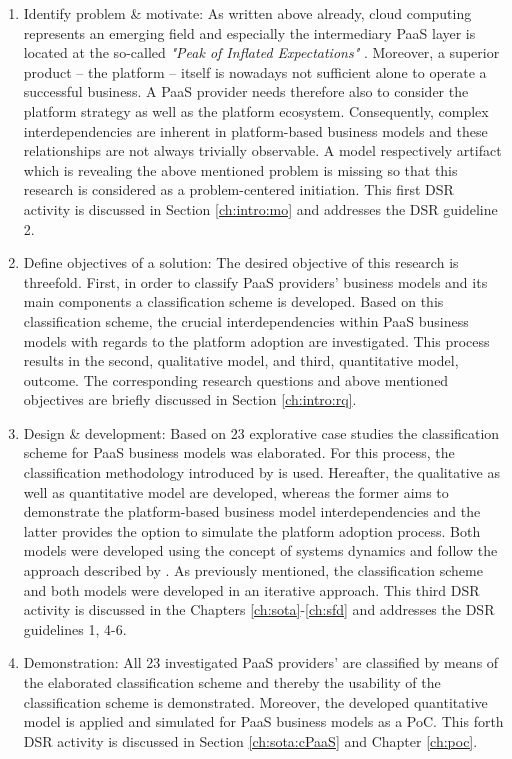 \begin{enumerate}
	\item Identify problem \& motivate: As written above already, cloud computing represents an emerging field and especially the intermediary \ac{PaaS} layer is located at the so-called \textit{"Peak of Inflated Expectations"} \citep[p. 5]{Smith2012}. Moreover, a superior product -- the platform -- itself is nowadays not sufficient alone to operate a successful business. A \ac{PaaS} provider needs therefore also to consider the platform strategy as well as the platform ecosystem. Consequently, complex interdependencies are inherent in platform-based business models and these relationships are not always trivially observable. A model respectively artifact which is revealing the above mentioned problem is missing so that this research is considered as a problem-centered initiation. This first \ac{DSR} activity is discussed in Section \ref{ch:intro:mo} and addresses the \ac{DSR} guideline 2.
	\item Define objectives of a solution: The desired objective of this research is threefold. First, in order to classify \ac{PaaS} providers' business models and its main components a classification scheme is developed. Based on this classification scheme, the crucial interdependencies within \ac{PaaS} business models with regards to the platform adoption are investigated. This process results in the second, qualitative model, and third, quantitative model, outcome. The corresponding research questions and above mentioned objectives are briefly discussed in Section \ref{ch:intro:rq}.
	\item Design \& development: Based on 23 explorative case studies the classification scheme for \ac{PaaS} business models was elaborated. For this process, the classification methodology introduced by \citet{Fettke2003} is used. Hereafter, the qualitative as well as quantitative model are developed, whereas the former aims to demonstrate the platform-based business model interdependencies and the latter provides the option to simulate the platform adoption process. Both models were developed using the concept of systems dynamics and follow the approach described by \citet{Sterman2000}. As previously mentioned, the classification scheme and both models were developed in an iterative approach. This third \ac{DSR} activity is discussed in the Chapters \ref{ch:sota}-\ref{ch:sfd} and addresses the \ac{DSR} guidelines 1, 4-6.
	\item Demonstration: All 23 investigated \ac{PaaS} providers' are classified by means of the elaborated classification scheme and thereby the usability of the classification scheme is demonstrated. Moreover, the developed quantitative model is applied and simulated for \ac{PaaS} business models as a \ac{PoC}. This forth \ac{DSR} activity is discussed in Section \ref{ch:sota:cPaaS} and Chapter \ref{ch:poc}.

\end{enumerate}
